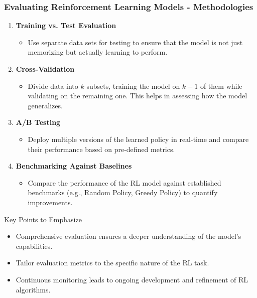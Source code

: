 \documentclass[aspectratio=169]{beamer}
\begin{document}
\begin{frame}[fragile]
    \frametitle{Evaluating Reinforcement Learning Models - Methodologies}
    \begin{enumerate}
        \item \textbf{Training vs. Test Evaluation}
        \begin{itemize}
            \item Use separate data sets for testing to ensure that the model is not just memorizing but actually learning to perform. 
        \end{itemize}

        \item \textbf{Cross-Validation}
        \begin{itemize}
            \item Divide data into \(k\) subsets, training the model on \(k-1\) of them while validating on the remaining one. This helps in assessing how the model generalizes.
        \end{itemize}

        \item \textbf{A/B Testing}
        \begin{itemize}
            \item Deploy multiple versions of the learned policy in real-time and compare their performance based on pre-defined metrics.
        \end{itemize}

        \item \textbf{Benchmarking Against Baselines}
        \begin{itemize}
            \item Compare the performance of the RL model against established benchmarks (e.g., Random Policy, Greedy Policy) to quantify improvements.
        \end{itemize}
    \end{enumerate}

    \begin{block}{Key Points to Emphasize}
        \begin{itemize}
            \item Comprehensive evaluation ensures a deeper understanding of the model’s capabilities.
            \item Tailor evaluation metrics to the specific nature of the RL task.
            \item Continuous monitoring leads to ongoing development and refinement of RL algorithms.
        \end{itemize}
    \end{block}
\end{frame}
\end{document}
